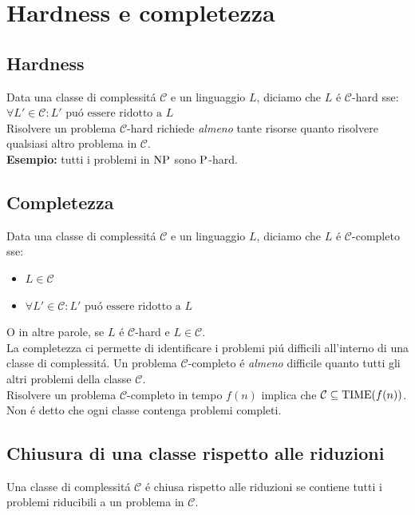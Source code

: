 \section{Hardness e completezza}


\subsection{Hardness}
Data una classe di complessitá $\mathcal{C}$ e un linguaggio $L$, 
diciamo che $L$ é $\mathcal{C}$-hard sse:
$\forall L' \in \mathcal{C}: L' \text{ puó essere ridotto a } L$ \\

Risolvere un problema $\mathcal{C}$-hard richiede \textit{almeno} tante risorse quanto risolvere qualsiasi altro problema in $\mathcal{C}$. \\

\textbf{Esempio:} tutti i problemi in $\NP$ sono $\P$-hard.


\subsection{Completezza}
Data una classe di complessitá $\mathcal{C}$ e un linguaggio $L$, 
diciamo che $L$ é $\mathcal{C}$-completo sse:
\begin{itemize}
    \item $L \in \mathcal{C}$
    \item $\forall L' \in \mathcal{C}: L' \text{ puó essere ridotto a } L$
\end{itemize}
O in altre parole, se $L$ é $\mathcal{C}$-hard e $L \in \mathcal{C}$.\\

La completezza ci permette di identificare i problemi piú difficili all'interno di una classe di complessitá.
Un problema $\mathcal{C}$-completo é \textit{almeno} difficile quanto tutti gli altri problemi della classe $\mathcal{C}$.\\
Risolvere un problema $\mathcal{C}$-completo in tempo $f(n)$ implica che $\mathcal{C} \subseteq \TIME(f(n))$.\\

Non é detto che ogni classe contenga problemi completi. \\


\subsection{Chiusura di una classe rispetto alle riduzioni}
Una classe di complessitá $\mathcal{C}$ é chiusa rispetto alle riduzioni se
contiene tutti i problemi riducibili a un problema in $\mathcal{C}$.

